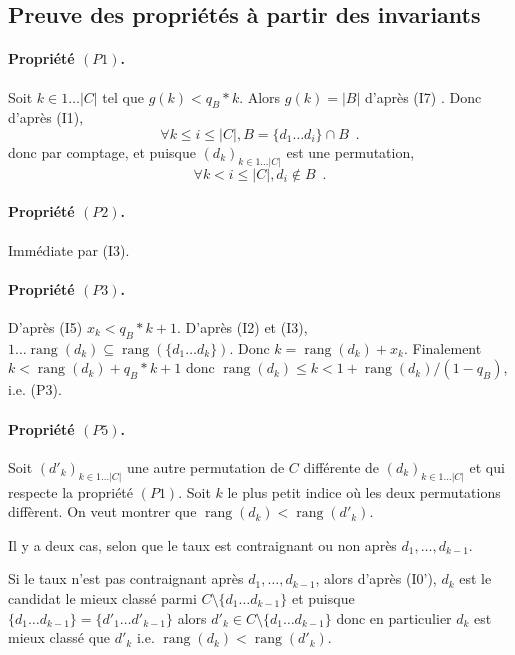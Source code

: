 \documentclass{article}
\DeclareMathOperator{\rang}{rang}
\begin{document}
\subsection{Preuve des propriétés à partir des invariants}

 \medskip
 
\paragraph{Propriété $(P1)$.}
 Soit $k\in 1 \ldots |C|$ tel que $g(k) < q_B * k$.
 Alors $g(k)=|B|$ d'après (I7) .
 Donc d'après (I1),
 \[
 \forall k \leq i \leq |C|, B =  \{d_1\ldots d_{i}\}\cap B\enspace.
 \]
 donc par comptage, et puisque $(d_k)_{k \in 1 \ldots |C|}$ est une permutation,
 \[
 \forall k < i \leq |C|, d_i \not \in B\enspace.
 \] 
 
\paragraph{Propriété $(P2)$.}
  Immédiate par (I3).
 
 \paragraph{Propriété $(P3)$.}
  D'après (I5) $x_k < q_B * k + 1$.
 D'après (I2) et (I3), $1\ldots \rang(d_k) \subseteq \rang(\{d_1\ldots d_k\})$.
 Donc $k=\rang(d_k) + x_k$.
 Finalement
 $k < \rang(d_k) + q_B * k + 1$
 donc
 $\rang(d_k) \leq k < 1 +  \rang(d_k) / (1 - q_B)$,
 i.e. (P3). 
 
 
 \paragraph{Propriété $(P5)$.}
 Soit $(d'_k)_{k\in 1 \ldots |C|}$ une autre permutation de $C$ différente de $(d_k)_{k\in 1 \ldots |C|}$
 et qui respecte la propriété $(P1)$.
 Soit $k$ le plus petit indice où les deux permutations diffèrent.
 On veut montrer que $\rang(d_k) < \rang(d'_k)$.

Il y a deux cas, selon que le taux est contraignant ou non
 après $d_1,\ldots, d_{k-1}$.

 Si le taux n'est pas contraignant après $d_1,\ldots, d_{k-1}$,
 alors d'après (I0'),
 $d_k$ est le candidat le mieux classé parmi
 $C \setminus \{d_1\ldots d_{k-1}\}$
 et puisque $\{d_1\ldots d_{k-1}\}=\{d'_1\ldots d'_{k-1}\}$ alors 
 $d'_k \in C \setminus \{d_1\ldots d_{k-1}\}$ donc
 en particulier $d_k$ est mieux classé que $d'_k$ i.e. $\rang(d_k) < \rang(d'_k)$.
\end{document}
